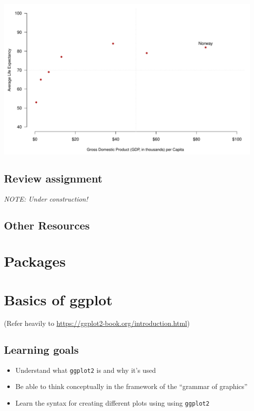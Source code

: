 \documentclass[
]{book}
\providecommand{\tightlist}{%
  \setlength{\itemsep}{0pt}\setlength{\parskip}{0pt}}
\begin{document}
\includegraphics{figures/unnamed-chunk-125-1.pdf}

\hypertarget{review-assignment-5}{%
\section*{Review assignment}\label{review-assignment-5}}

\emph{NOTE: Under construction!}

\hypertarget{other-resources-5}{%
\section*{Other Resources}\label{other-resources-5}}

\hypertarget{packages}{%
\chapter{Packages}\label{packages}}

\hypertarget{basics-of-ggplot}{%
\chapter{Basics of ggplot}\label{basics-of-ggplot}}

(Refer heavily to \url{https://ggplot2-book.org/introduction.html})

\hypertarget{learning-goals-6}{%
\section{Learning goals}\label{learning-goals-6}}

\begin{itemize}
\tightlist
\item
  Understand what \texttt{ggplot2} is and why it's used
\item
  Be able to think conceptually in the framework of the ``grammar of graphics''
\item
  Learn the syntax for creating different plots using using \texttt{ggplot2}
\end{itemize}
\end{document}
